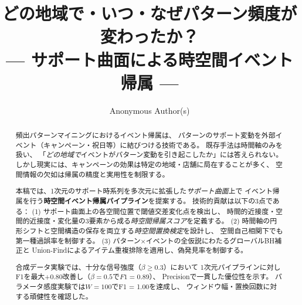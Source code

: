 \documentclass[sigconf,natbib=true]{acmart}
\begin{document}
\title{どの地域で・いつ・なぜパターン頻度が変わったか？\\
--- サポート曲面による時空間イベント帰属 ---}

\author{Anonymous Author(s)}

\begin{abstract}
頻出パターンマイニングにおけるイベント帰属は、
パターンのサポート変動を外部イベント（キャンペーン・祝日等）に結びつける技術である。
既存手法は時間軸のみを扱い、
「\emph{どの地域で}イベントがパターン変動を引き起こしたか」には答えられない。
しかし現実には、キャンペーンの効果は特定の地域・店舗に局在することが多く、
空間情報の欠如は帰属の精度と実用性を制限する。

本稿では、1次元のサポート時系列を多次元に拡張した\emph{サポート曲面}上で
イベント帰属を行う\textbf{時空間イベント帰属パイプライン}を提案する。
技術的貢献は以下の3点である：
(1) サポート曲面上の各空間位置で閾値交差変化点を検出し、
時間的近接度・空間的近接度・変化量の3要素から成る\emph{時空間帰属スコア}を定義する。
(2) 時間軸の円形シフトと空間構造の保存を両立する\emph{時空間置換検定}を設計し、
空間自己相関下でも第一種過誤率を制御する。
(3) パターン$\times$イベントの全仮説にわたるグローバルBH補正と
Union-Findによるアイテム重複排除を適用し、偽発見率を制御する。

合成データ実験では、十分な信号強度（$\beta \geq 0.3$）において
1次元パイプラインに対しF1を最大+0.80改善し（$\beta = 0.5$で$F1 = 0.89$）、
Precisionで一貫した優位性を示す。
パラメータ感度実験では$W = 100$でF1 = 1.00を達成し、
ウィンドウ幅・置換回数に対する頑健性を確認した。
\end{abstract}


\maketitle










\end{document}
